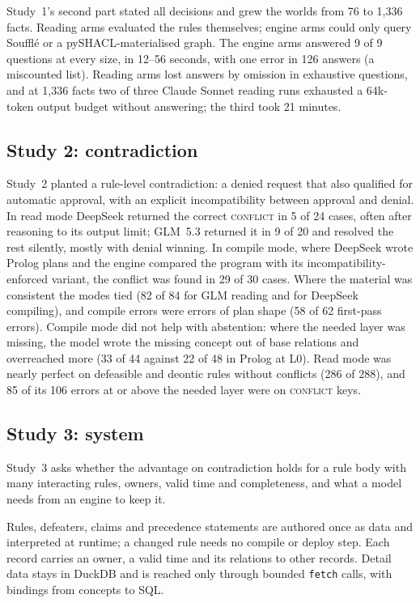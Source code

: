 \documentclass[11pt]{article}
\newcommand{\st}[1]{\textsc{#1}}
\begin{document}
Study~1's second part stated all decisions and grew the worlds from 76 to 1,336 facts. Reading arms evaluated the
rules themselves; engine arms could only query Souffl\'e or a pySHACL-materialised graph. The engine arms answered 9
of 9 questions at every size, in 12--56 seconds, with one error in 126 answers (a miscounted list). Reading arms lost
answers by omission in exhaustive questions, and at 1,336 facts two of three Claude Sonnet reading runs exhausted a
64k-token output budget without answering; the third took 21 minutes.

\subsection{Study 2: contradiction}

Study~2 planted a rule-level contradiction: a denied request that also qualified for automatic approval, with an
explicit incompatibility between approval and denial. In read mode DeepSeek returned the correct \st{conflict} in 5
of 24 cases, often after reasoning to its output limit; GLM~5.3 returned it in 9 of 20 and resolved the rest
silently, mostly with denial winning. In compile mode, where DeepSeek wrote Prolog plans and the engine compared the
program with its incompatibility-enforced variant, the conflict was found in 29 of 30 cases. Where the material was
consistent the modes tied (82 of 84 for GLM reading and for DeepSeek compiling), and compile errors were errors of
plan shape (58 of 62 first-pass errors). Compile mode did not help with abstention: where the needed layer was
missing, the model wrote the missing concept out of base relations and overreached more (33 of 44 against 22 of 48
in Prolog at L0). Read mode was nearly perfect on defeasible and deontic rules without conflicts (286 of 288), and 85
of its 106 errors at or above the needed layer were on \st{conflict} keys.

\subsection{Study 3: system}
\label{sec:system}

Study~3 asks whether the advantage on contradiction holds for a rule body with many interacting rules, owners,
valid time and completeness, and what a model needs from an engine to keep it.

Rules, defeaters, claims and precedence statements are authored once as data and interpreted at runtime; a changed
rule needs no compile or deploy step. Each record carries an owner, a valid time and its relations to other records.
Detail data stays in DuckDB \citep{raasveldt2019duckdb} and is reached only through bounded \texttt{fetch} calls,
with bindings from concepts to SQL.
\end{document}
